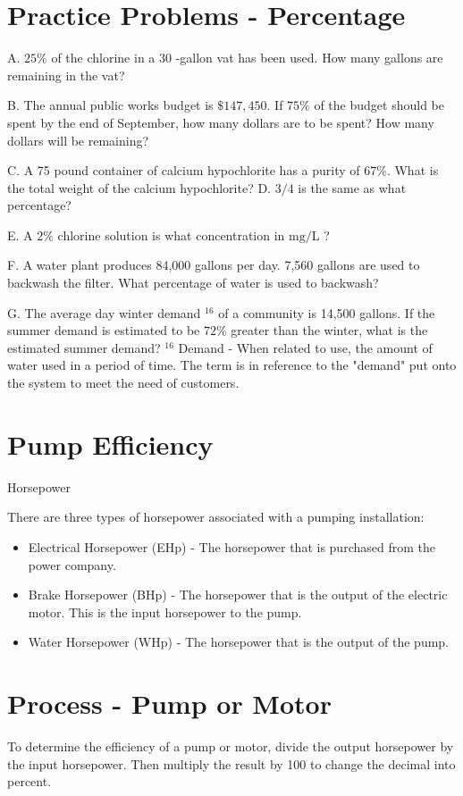 \section{Practice Problems - Percentage}
A. $25 \%$ of the chlorine in a 30 -gallon vat has been used. How many gallons are remaining in the vat?

B. The annual public works budget is $\$ 147,450$. If $75 \%$ of the budget should be spent by the end of September, how many dollars are to be spent? How many dollars will be remaining?

C. A 75 pound container of calcium hypochlorite has a purity of $67 \%$. What is the total weight of the calcium hypochlorite? D. $3 / 4$ is the same as what percentage?

E. A $2 \%$ chlorine solution is what concentration in $\mathrm{mg} / \mathrm{L}$ ?

F. A water plant produces 84,000 gallons per day. 7,560 gallons are used to backwash the filter. What percentage of water is used to backwash?

G. The average day winter demand ${ }^{16}$ of a community is 14,500 gallons. If the summer demand is estimated to be $72 \%$ greater than the winter, what is the estimated summer demand? ${ }^{16}$ Demand - When related to use, the amount of water used in a period of time. The term is in reference to the "demand" put onto the system to meet the need of customers.

\section{Pump Efficiency}
Horsepower

There are three types of horsepower associated with a pumping installation:

\begin{itemize}
  \item Electrical Horsepower (EHp) - The horsepower that is purchased from the power company.

  \item Brake Horsepower (BHp) - The horsepower that is the output of the electric motor. This is the input horsepower to the pump.

  \item Water Horsepower (WHp) - The horsepower that is the output of the pump.

\end{itemize}
\section{Process - Pump or Motor}
To determine the efficiency of a pump or motor, divide the output horsepower by the input horsepower. Then multiply the result by 100 to change the decimal into percent.

